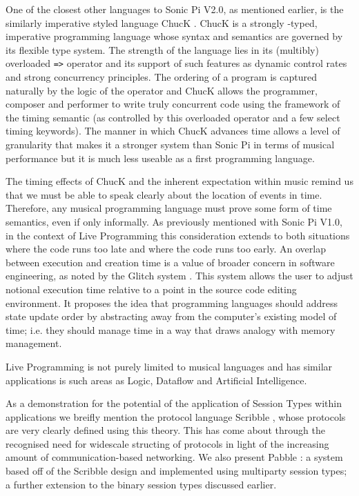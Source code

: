 \documentclass[11pt]{scrartcl}
\begin{document}
One of the closest other languages to Sonic Pi V2.0, as mentioned earlier, is 
the similarly imperative styled language ChucK \cite{WC03}. ChucK is a strongly
-typed, imperative programming language whose syntax and semantics are 
governed by its flexible type system. The strength of the language lies in its 
(multibly) overloaded \texttt{=>} operator and its support of such features as 
dynamic control rates and strong concurrency principles. The ordering of a 
program is captured naturally by the logic of the operator and ChucK allows 
the programmer, composer and performer to write truly concurrent code using 
the framework of the timing semantic (as controlled by this overloaded 
operator and a few select timing keywords). The manner in which ChucK advances 
time allows a level of granularity that makes it a stronger system than Sonic 
Pi in terms of musical performance but it is much less useable as a first 
programming language.

The timing effects of ChucK and the inherent expectation within music remind 
us that we must be able to speak clearly about the location of events in time. 
Therefore, any musical programming language must prove some form of time 
semantics, even if only informally. As previously mentioned with Sonic Pi 
V1.0, in the context of Live Programming this consideration extends to both 
situations where the code runs too late and where the code runs too early. An 
overlap between execution and creation time is a value of broader concern in 
software engineering, as noted by the Glitch system \cite{ME14}. This system 
allows the user to adjust notional execution time relative to a point in the 
source code editing environment. It proposes the idea that programming 
languages should address state update order by abstracting away from the 
computer's existing model of time; i.e. they should manage time in a way that 
draws analogy with memory management. 

Live Programming is not purely limited to musical languages and has similar 
applications is such areas as Logic, Dataflow and Artificial Intelligence.

As a demonstration for the potential of the application of Session Types 
within applications we breifly mention the protocol language Scribble 
\cite{HMBCY11}, whose protocols are very clearly defined using this theory. 
This has come about through the recognised need for widescale structing of 
protocols in light of the increasing amount of communication-based networking. 
We also present Pabble \cite{NY14}: a system based off of the Scribble design 
and implemented using multiparty session types; a further extension to the 
binary session types discussed earlier.
\end{document}
